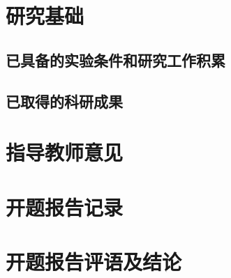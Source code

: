 \documentclass[ma]{xdupgtp}
\begin{document}
\section{研究基础}
\begin{yjjc}
\subsection{已具备的实验条件和研究工作积累}
\subsection{已取得的科研成果}
\end{yjjc}

\section{指导教师意见}
\begin{jsyj}
\end{jsyj}

\section{开题报告记录}
\begin{bgjl}
\end{bgjl}

\section{开题报告评语及结论}
\begin{pyjl}
\end{pyjl}
\end{document}
